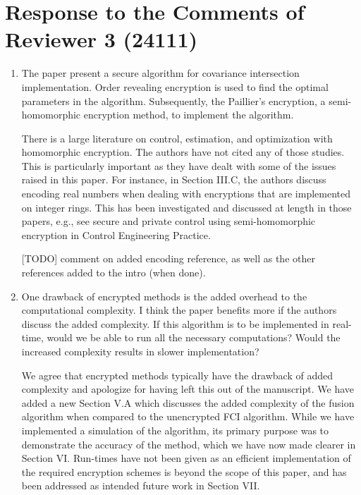 \documentclass[a4paper]{scrartcl}
\newenvironment{rebuttal}{\begin{enumerate}[label={\color{grey}\thesection.\arabic{enumi}},leftmargin=0pt,ref=\thesection.\arabic{enumi}]}{\end{enumerate}}
\newcommand{\reviewtext}[1]{{\color{nblue} #1}}
\begin{document}
\section*{Response to the Comments of Reviewer 3 (24111)}
\def\thesection{R3}
\begin{rebuttal}
\item \reviewtext{The paper present a secure algorithm for covariance intersection
implementation. Order revealing encryption is used to find the optimal
parameters in the algorithm. Subsequently, the Paillier's encryption, a
semi-homomorphic encryption method, to implement the algorithm. 

There is a large literature on control, estimation, and optimization
with homomorphic encryption. The authors have not cited any of those
studies. This is particularly important as they have dealt with some of
the issues raised in this paper. For instance, in Section III.C, the
authors discuss encoding real numbers when dealing with encryptions
that are implemented on integer rings. This has been investigated and
discussed at length in those papers, e.g., see secure and private
control using semi-homomorphic encryption in Control Engineering
Practice.}

[TODO] comment on added encoding reference, as well as the other references added to the intro (when done).

\item \reviewtext{One drawback of encrypted methods is the added overhead to the
computational complexity. I think the paper benefits more if the
authors discuss the added complexity. If this algorithm is to be
implemented in real-time, would we be able to run all the necessary
computations? Would the increased complexity results in slower
implementation?}

We agree that encrypted methods typically have the drawback of added complexity and apologize for having left this out of the manuscript. We have added a new Section V.A which discusses the added complexity of the fusion algorithm when compared to the unencrypted FCI algorithm. While we have implemented a simulation of the algorithm, its primary purpose was to demonstrate the accuracy of the method, which we have now made clearer in Section VI. Run-times have not been given as an efficient implementation of the required encryption schemes is beyond the scope of this paper, and has been addressed as intended future work in Section VII.

\end{rebuttal}


\end{document}
